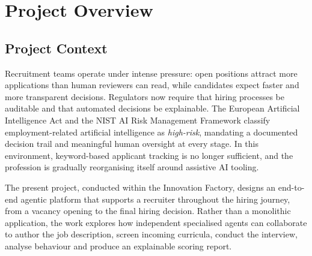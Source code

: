 \section{Project Overview}

\subsection{Project Context}
Recruitment teams operate under intense pressure: open positions attract
more applications than human reviewers can read, while candidates expect
faster and more transparent decisions. Regulators now require that hiring
processes be auditable and that automated decisions be explainable. The
European Artificial Intelligence Act and the NIST AI Risk Management
Framework classify employment-related artificial intelligence as
\emph{high-risk}, mandating a documented decision trail and meaningful
human oversight at every stage. In this environment, keyword-based
applicant tracking is no longer sufficient, and the profession is
gradually reorganising itself around assistive AI tooling.

The present project, conducted within the Innovation Factory, designs an
end-to-end agentic platform that supports a recruiter throughout the
hiring journey, from a vacancy opening to the final hiring decision.
Rather than a monolithic application, the work explores how independent
specialised agents can collaborate to author the job description, screen
incoming curricula, conduct the interview, analyse behaviour and produce
an explainable scoring report.

